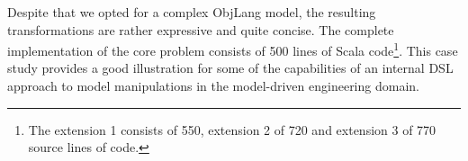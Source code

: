 Despite that we opted for a complex ObjLang model, the resulting transformations are rather expressive and quite concise.
The complete implementation of the core problem consists of 500 lines of Scala code\footnote{The extension 1 consists of 550, extension 2 of 720 and extension 3 of 770 source lines of code.}.
This \FIXML case study provides a good illustration for some of the capabilities of an internal DSL approach to model manipulations in the model-driven engineering domain.









